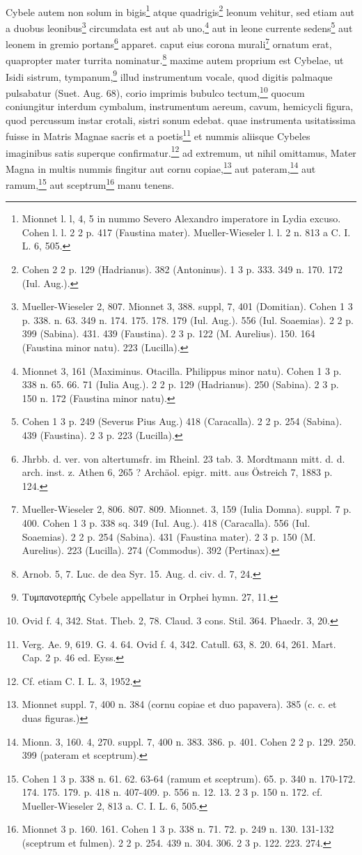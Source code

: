 \documentclass[a4paper, 11pt, oneside, polutonikogreek, german]{article}
\begin{document}
\paragraph{}
Cybele autem non solum in bigis\footnote{Mionnet l. l, 4, 5 in nummo Severo Alexandro imperatore in Lydia excuso. Cohen l. l. 2 2 p. 417 (Faustina mater). Mueller-Wieseler l. l. 2 n. 813 a C. I. L. 6, 505.} atque quadrigis\footnote{Cohen 2 2 p. 129 (Hadrianus). 382 (Antoninus). 1 3 p. 333. 349 n. 170. 172 (Iul. Aug.).} leonum vehitur, sed etiam aut a duobus leonibus\footnote{Mueller-Wieseler 2, 807. Mionnet 3, 388. suppl, 7, 401 (Domitian). Cohen 1 3 p. 338. n. 63. 349 n. 174. 175. 178. 179 (Iul. Aug.). 556 (Iul. Soaemias). 2 2 p. 399 (Sabina). 431. 439 (Faustina). 2 3 p. 122 (M. Aurelius). 150. 164 (Faustina minor natu). 223 (Lucilla).} circumdata est aut ab uno,\footnote{Mionnet 3, 161 (Maximinus. Otacilla. Philippus minor natu). Cohen 1 3 p. 338 n. 65. 66. 71 (Iulia Aug.). 2 2 p. 129 (Hadrianus). 250 (Sabina). 2 3 p. 150 n. 172 (Faustina minor natu).} aut in leone currente sedens\footnote{Cohen 1 3 p. 249 (Severus Pius Aug.) 418 (Caracalla). 2 2 p. 254 (Sabina). 439 (Faustina). 2 3 p. 223 (Lucilla).} aut leonem in gremio portans\footnote{Jhrbb. d. ver. von altertumsfr. im Rheinl. 23 tab. 3. Mordtmann mitt. d. d. arch. inst. z. Athen 6, 265 ? Archäol. epigr. mitt. aus Östreich 7, 1883 p. 124.} apparet. caput eius corona murali\footnote{Mueller-Wieseler 2, 806. 807. 809. Mionnet. 3, 159 (Iulia Domna). suppl. 7 p. 400. Cohen 1 3 p. 338 sq. 349 (Iul. Aug.). 418 (Caracalla). 556 (Iul. Soaemias). 2 2 p. 254 (Sabina). 431 (Faustina mater). 2 3 p. 150 (M. Aurelius). 223 (Lucilla). 274 (Commodus). 392 (Pertinax).} ornatum erat, quapropter mater turrita nominatur.\footnote{Arnob. 5, 7. Luc. de dea Syr. 15. Aug. d. civ. d. 7, 24.} maxime autem proprium est Cybelae, ut Isidi sistrum, tympanum,\footnote{Τυμπανοτερπής Cybele appellatur in Orphei hymn. 27, 11.} illud instrumentum vocale, quod digitis palmaque pulsabatur (Suet. Aug. 68), corio imprimis bubulco tectum,\footnote{Ovid f. 4, 342. Stat. Theb. 2, 78. Claud. 3 cons. Stil. 364. Phaedr. 3, 20.} quocum coniungitur interdum cymbalum, instrumentum aereum, cavum, hemicycli figura, quod percussum instar crotali, sistri sonum edebat. quae instrumenta usitatissima fuisse in Matris Magnae sacris et a poetis\footnote{Verg. Ae. 9, 619. G. 4. 64. Ovid f. 4, 342. Catull. 63, 8. 20. 64, 261. Mart. Cap. 2 p. 46 ed. Eyss.} et nummis aliisque Cybeles imaginibus satis superque confirmatur.\footnote{Cf. etiam C. I. L. 3, 1952.} ad extremum, ut nihil omittamus, Mater Magna in multis nummis fingitur aut cornu copiae,\footnote{Mionnet suppl. 7, 400 n. 384 (cornu copiae et duo papavera). 385 (c. c. et duas figuras.)} aut pateram,\footnote{Mionn. 3, 160. 4, 270. suppl. 7, 400 n. 383. 386. p. 401. Cohen 2 2 p. 129. 250. 399 (pateram et sceptrum).} aut ramum,\footnote{Cohen 1 3 p. 338 n. 61. 62. 63-64 (ramum et sceptrum). 65. p. 340 n. 170-172. 174. 175. 179. p. 418 n. 407-409. p. 556 n. 12. 13. 2 3 p. 150 n. 172. cf. Mueller-Wieseler 2, 813 a. C. I. L. 6, 505.} aut sceptrum\footnote{Mionnet 3 p. 160. 161. Cohen 1 3 p. 338 n. 71. 72. p. 249 n. 130. 131-132 (sceptrum et fulmen). 2 2 p. 254. 439 n. 304. 306. 2 3 p. 122. 223. 274.} manu tenens.
\end{document}

